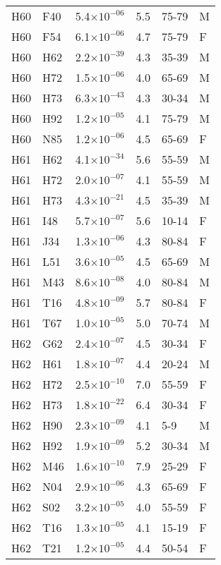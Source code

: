 \begin{longtable}{lllrll}
   H60 & F40 & 5.4$\times10^{-06}$ & 5.5 & 75-79 & M \\ 
   H60 & F54 & 6.1$\times10^{-06}$ & 4.7 & 75-79 & F \\ 
   H60 & H62 & 2.2$\times10^{-39}$ & 4.3 & 35-39 & M \\ 
   H60 & H72 & 1.5$\times10^{-06}$ & 4.0 & 65-69 & M \\ 
   H60 & H73 & 6.3$\times10^{-43}$ & 4.3 & 30-34 & M \\ 
   H60 & H92 & 1.2$\times10^{-05}$ & 4.1 & 75-79 & M \\ 
   H60 & N85 & 1.2$\times10^{-06}$ & 4.5 & 65-69 & F \\ 
   H61 & H62 & 4.1$\times10^{-34}$ & 5.6 & 55-59 & M \\ 
   H61 & H72 & 2.0$\times10^{-07}$ & 4.1 & 55-59 & M \\ 
   H61 & H73 & 4.3$\times10^{-21}$ & 4.5 & 35-39 & M \\ 
   H61 & I48 & 5.7$\times10^{-07}$ & 5.6 & 10-14 & F \\ 
   H61 & J34 & 1.3$\times10^{-06}$ & 4.3 & 80-84 & F \\ 
   H61 & L51 & 3.6$\times10^{-05}$ & 4.5 & 65-69 & M \\ 
   H61 & M43 & 8.6$\times10^{-08}$ & 4.0 & 80-84 & M \\ 
   H61 & T16 & 4.8$\times10^{-09}$ & 5.7 & 80-84 & F \\ 
   H61 & T67 & 1.0$\times10^{-05}$ & 5.0 & 70-74 & M \\ 
   H62 & G62 & 2.4$\times10^{-07}$ & 4.5 & 30-34 & F \\ 
   H62 & H61 & 1.8$\times10^{-07}$ & 4.4 & 20-24 & M \\ 
   H62 & H72 & 2.5$\times10^{-10}$ & 7.0 & 55-59 & F \\ 
   H62 & H73 & 1.8$\times10^{-22}$ & 6.4 & 30-34 & F \\ 
   H62 & H90 & 2.3$\times10^{-09}$ & 4.1 & 5-9 & M \\ 
   H62 & H92 & 1.9$\times10^{-09}$ & 5.2 & 30-34 & M \\ 
   H62 & M46 & 1.6$\times10^{-10}$ & 7.9 & 25-29 & F \\ 
   H62 & N04 & 2.9$\times10^{-06}$ & 4.3 & 65-69 & F \\ 
   H62 & S02 & 3.2$\times10^{-05}$ & 4.0 & 55-59 & F \\ 
   H62 & T16 & 1.3$\times10^{-05}$ & 4.1 & 15-19 & F \\ 
   H62 & T21 & 1.2$\times10^{-05}$ & 4.4 & 50-54 & F \\ 

\end{longtable}
